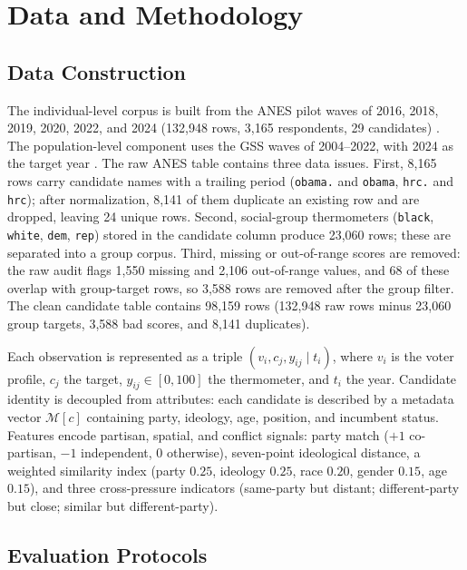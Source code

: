\chapter{Data and Methodology}
\label{ch:method}

\section{Data Construction}

The individual-level corpus is built from the ANES pilot waves of 2016, 2018,
2019, 2020, 2022, and 2024 (132,948 rows, 3,165 respondents, 29 candidates) \citep{anesdata}. The
population-level component uses the GSS waves of 2004--2022, with 2024 as the
target year \citep{gssdata}. The raw ANES table contains three data issues.
First, 8,165 rows carry candidate names with a trailing period (\texttt{obama.}
and \texttt{obama}, \texttt{hrc.} and \texttt{hrc}); after normalization, 8,141
of them duplicate an existing row and are dropped, leaving 24 unique rows.
Second, social-group thermometers (\texttt{black}, \texttt{white}, \texttt{dem},
\texttt{rep}) stored in the candidate column produce 23,060 rows; these are
separated into a group corpus. Third, missing or out-of-range scores are removed:
the raw audit flags 1,550 missing and 2,106 out-of-range values, and 68 of these
overlap with group-target rows, so 3,588 rows are removed after the group filter.
The clean candidate table contains 98,159 rows (132,948 raw rows minus 23,060
group targets, 3,588 bad scores, and 8,141 duplicates).

Each observation is represented as a triple $(v_i,c_j,y_{ij}\mid t_i)$, where
$v_i$ is the voter profile, $c_j$ the target, $y_{ij}\in[0,100]$ the thermometer,
and $t_i$ the year. Candidate identity is decoupled from attributes: each
candidate is described by a metadata vector $\mathcal{M}[c]$ containing party,
ideology, age, position, and incumbent status. Features encode partisan, spatial,
and conflict signals: party match ($+1$ co-partisan, $-1$ independent, $0$
otherwise), seven-point ideological distance, a weighted similarity index (party
$0.25$, ideology $0.25$, race $0.20$, gender $0.15$, age $0.15$), and three
cross-pressure indicators (same-party but distant; different-party but close;
similar but different-party).

\section{Evaluation Protocols}

